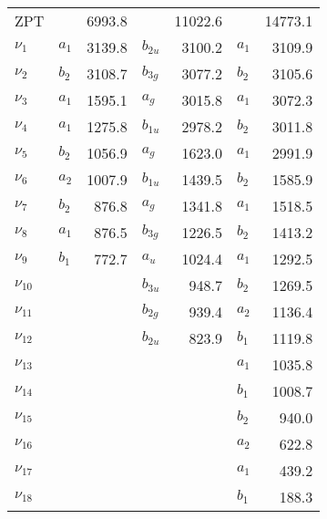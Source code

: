 \begin{table}
\begin{tabular}{llrlrlr}
\hline
 ZPT &          &   6993.8 &          &  11022.6 &          &  14773.1 \\
 $\nu_{1 }$ & $   a_1$ &   3139.8 & $b_{2u}$ &   3100.2 & $   a_1$ &   3109.9 \\
 $\nu_{2 }$ & $   b_2$ &   3108.7 & $b_{3g}$ &   3077.2 & $   b_2$ &   3105.6 \\
 $\nu_{3 }$ & $   a_1$ &   1595.1 & $   a_g$ &   3015.8 & $   a_1$ &   3072.3 \\
 $\nu_{4 }$ & $   a_1$ &   1275.8 & $b_{1u}$ &   2978.2 & $   b_2$ &   3011.8 \\
 $\nu_{5 }$ & $   b_2$ &   1056.9 & $   a_g$ &   1623.0 & $   a_1$ &   2991.9 \\
 $\nu_{6 }$ & $   a_2$ &   1007.9 & $b_{1u}$ &   1439.5 & $   b_2$ &   1585.9 \\
 $\nu_{7 }$ & $   b_2$ &    876.8 & $   a_g$ &   1341.8 & $   a_1$ &   1518.5 \\
 $\nu_{8 }$ & $   a_1$ &    876.5 & $b_{3g}$ &   1226.5 & $   b_2$ &   1413.2 \\
 $\nu_{9 }$ & $   b_1$ &    772.7 & $   a_u$ &   1024.4 & $   a_1$ &   1292.5 \\
 $\nu_{10}$ &          &          & $b_{3u}$ &    948.7 & $   b_2$ &   1269.5 \\
 $\nu_{11}$ &          &          & $b_{2g}$ &    939.4 & $   a_2$ &   1136.4 \\
 $\nu_{12}$ &          &          & $b_{2u}$ &    823.9 & $   b_1$ &   1119.8 \\
 $\nu_{13}$ &          &          &          &          & $   a_1$ &   1035.8 \\
 $\nu_{14}$ &          &          &          &          & $   b_1$ &   1008.7 \\
 $\nu_{15}$ &          &          &          &          & $   b_2$ &    940.0 \\
 $\nu_{16}$ &          &          &          &          & $   a_2$ &    622.8 \\
 $\nu_{17}$ &          &          &          &          & $   a_1$ &    439.2 \\
 $\nu_{18}$ &          &          &          &          & $   b_1$ &    188.3 \\
\end{tabular}
\end{table}
